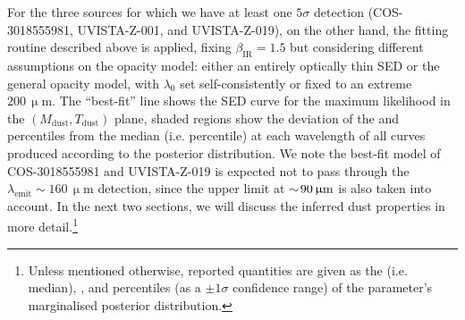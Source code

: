 For the three sources for which we have at least one $5 \sigma$ detection (COS-3018555981, UVISTA-Z-001, and UVISTA-Z-019), on the other hand, the  fitting routine described above is applied, fixing $\beta_\text{IR} = 1.5$ but considering different assumptions on the opacity model: either an entirely optically thin SED or the general opacity model, with $\lambda_0$ set self-consistently or fixed to an extreme $200 \, \mathrm{\upmu m}$. The ``best-fit'' line shows the SED curve for the maximum likelihood in the $(M_\text{dust}, T_\text{dust})$ plane, shaded regions show the deviation of the  and  percentiles from the median (i.e.  percentile) at each wavelength of all curves produced according to the posterior distribution. We note the best-fit model of COS-3018555981 and UVISTA-Z-019 is expected not to pass through the $\lambda_\text{emit} \sim 160 \, \mathrm{\upmu m}$ detection, since the upper limit at $\sim \! 90 \, \mathrm{\upmu m}$ is also taken into account. In the next two sections, we will discuss the inferred dust properties in more detail.\footnote{Unless mentioned otherwise, reported quantities are given as the  (i.e. median), , and  percentiles (as a $\pm 1 \sigma$ confidence range) of the parameter's marginalised posterior distribution.}
